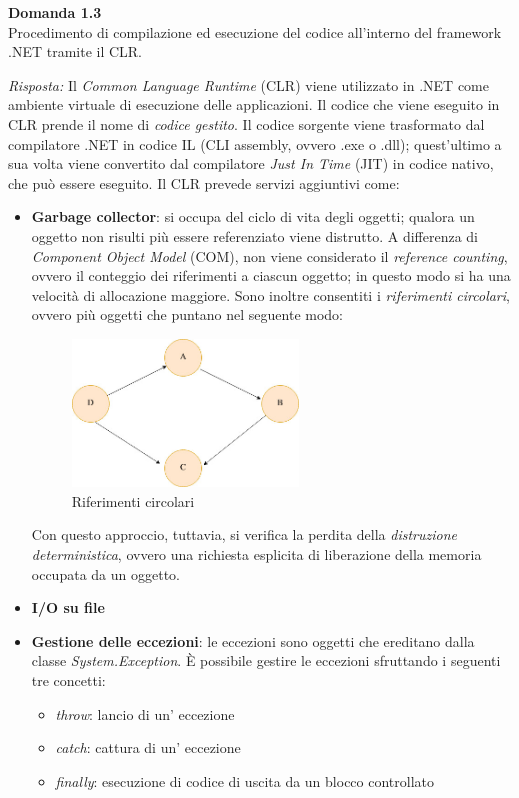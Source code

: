 \documentclass{article}
\newenvironment{problem}[2][Domanda]
    { \begin{mdframed}[backgroundcolor=gray!20] \textbf{#1 #2} \\}
    {  \end{mdframed}}
\newenvironment{solution}
    {\textit{Risposta:}}
    {}
\begin{document}
\begin{problem}{1.3}
Procedimento di compilazione ed esecuzione del codice all'interno del framework .NET tramite il CLR.
\end{problem}
\begin{solution}
Il \textit{Common Language Runtime} (CLR) viene utilizzato in .NET come ambiente virtuale di esecuzione delle applicazioni.
Il codice che viene eseguito in CLR prende il nome di \textit{codice gestito}.
\newline
Il codice sorgente viene trasformato dal compilatore .NET in codice IL (CLI assembly, ovvero .exe o .dll); quest'ultimo a sua volta viene convertito dal compilatore \textit{Just In Time} (JIT) in codice nativo, che può essere eseguito.
\newline
Il CLR prevede servizi aggiuntivi come:
\begin{itemize}
	\item \textbf{Garbage collector}: si occupa del ciclo di vita degli oggetti; qualora un oggetto non risulti più essere referenziato viene distrutto.
	\newline
	A differenza di \textit{Component Object Model} (COM), non viene considerato il \textit{reference counting}, ovvero il conteggio dei riferimenti a ciascun oggetto; in questo modo si ha una velocità di allocazione maggiore.
	\newline
	Sono inoltre consentiti i \textit{riferimenti circolari}, ovvero più oggetti che puntano nel seguente modo:
	\begin{figure}[h]
	\centering
	\includegraphics[width=6cm]{./immagini/riferimentiCircolari.jpg}
	\caption{Riferimenti circolari}
\end{figure}

	Con questo approccio, tuttavia, si verifica la perdita della \textit{distruzione deterministica}, ovvero una richiesta esplicita di liberazione della memoria occupata da un oggetto.
	\item \textbf{I/O su file}
	\item \textbf{Gestione delle eccezioni}: le eccezioni sono oggetti che ereditano dalla classe \textit{System.Exception}.
	\newline
	È possibile gestire le eccezioni sfruttando i seguenti tre concetti:
	\begin{itemize}
		\item \textit{throw}: lancio di un' eccezione
		\item \textit{catch}: cattura di un' eccezione
		\item \textit{finally}: esecuzione di codice di uscita da un blocco controllato
	\end{itemize}
\end{itemize}
\end{solution}
\end{document}
